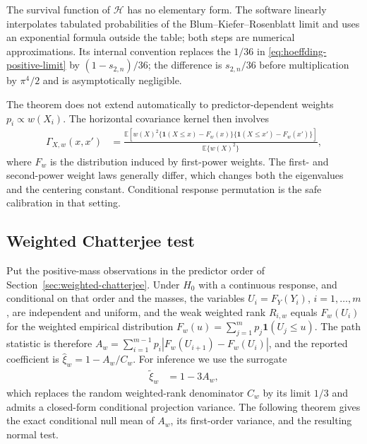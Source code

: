 The survival function of $\mathcal H$ has no elementary form. The software
linearly interpolates tabulated probabilities of the Blum--Kiefer--Rosenblatt
limit and uses an exponential formula outside the table; both steps are
numerical approximations. Its internal convention replaces the $1/36$ in
\eqref{eq:hoeffding-positive-limit} by $(1-s_{2,n})/36$; the difference is
$s_{2,n}/36$ before multiplication by $\pi^4/2$ and is asymptotically
negligible.

The theorem does not extend automatically to predictor-dependent weights
$p_i\propto w(X_i)$. The horizontal covariance kernel then involves
\begin{align*}
  \Gamma_{X,w}(x,x')
  &=\frac{
    \mathbb{E}\!\left[
      w(X)^2
      \{\mathbf{1}(X\leq x)-F_w(x)\}
      \{\mathbf{1}(X\leq x')-F_w(x')\}
    \right]
  }{\mathbb{E}\{w(X)^2\}},
\end{align*}
where $F_w$ is the distribution induced by first-power weights. The first- and
second-power weight laws generally differ, which changes both the eigenvalues
and the centering constant. Conditional response permutation is the safe
calibration in that setting.

\subsection{Weighted Chatterjee test}
\label{subsec:chatterjee-test}

Put the positive-mass observations in the predictor order of
Section~\ref{sec:weighted-chatterjee}. Under $H_0$ with a continuous
response, and conditional on that order and the masses, the variables
$U_i=F_Y(Y_i)$, $i=1,\ldots,m$, are independent and uniform, and the weak
weighted rank $R_{i,w}$ equals $F_w(U_i)$ for the weighted empirical
distribution $F_w(u)=\sum_{j=1}^m p_j\mathbf{1}(U_j\leq u)$. The path
statistic is therefore
$A_w=\sum_{i=1}^{m-1}p_i|F_w(U_{i+1})-F_w(U_i)|$, and the reported
coefficient is $\widehat\xi_w=1-A_w/C_w$. For inference we use the surrogate
\begin{align*}
  \widetilde\xi_w
  &=1-3A_w,
\end{align*}
which replaces the random weighted-rank denominator $C_w$ by its limit $1/3$
and admits a closed-form conditional projection variance. The following
theorem gives the exact conditional null mean of $A_w$, its first-order
variance, and the resulting normal test.


